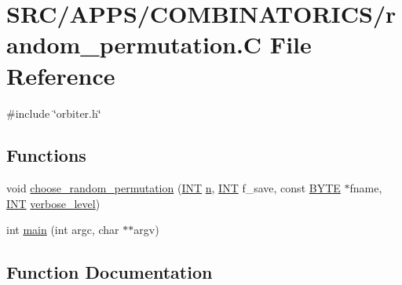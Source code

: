 \hypertarget{random__permutation_8_c}{}\section{S\+R\+C/\+A\+P\+P\+S/\+C\+O\+M\+B\+I\+N\+A\+T\+O\+R\+I\+C\+S/random\+\_\+permutation.C File Reference}
\label{random__permutation_8_c}
{\ttfamily \#include \char`\"{}orbiter.\+h\char`\"{}}\newline
\subsection*{Functions}
\begin{DoxyCompactItemize}
\item 
void \mbox{\hyperlink{random__permutation_8_c_a56206e0f18434959b051001c6b4cc726}{choose\+\_\+random\+\_\+permutation}} (\mbox{\hyperlink{galois_8h_a09fddde158a3a20bd2dcadb609de11dc}{I\+NT}} \mbox{\hyperlink{simeon_8_c_a7f2cd26777ce0ff3fdaf8d02aacbddfb}{n}}, \mbox{\hyperlink{galois_8h_a09fddde158a3a20bd2dcadb609de11dc}{I\+NT}} f\+\_\+save, const \mbox{\hyperlink{galois_8h_ab6cc7b4aeb6ea31aba2b3fbfc83ff5e6}{B\+Y\+TE}} $\ast$fname, \mbox{\hyperlink{galois_8h_a09fddde158a3a20bd2dcadb609de11dc}{I\+NT}} \mbox{\hyperlink{simeon_8_c_a818073fbcc2f439e7c56952f67386122}{verbose\+\_\+level}})
\item 
int \mbox{\hyperlink{random__permutation_8_c_a3c04138a5bfe5d72780bb7e82a18e627}{main}} (int argc, char $\ast$$\ast$argv)
\end{DoxyCompactItemize}


\subsection{Function Documentation}
\mbox{\label{random__permutation_8_c_a56206e0f18434959b051001c6b4cc726}} 
